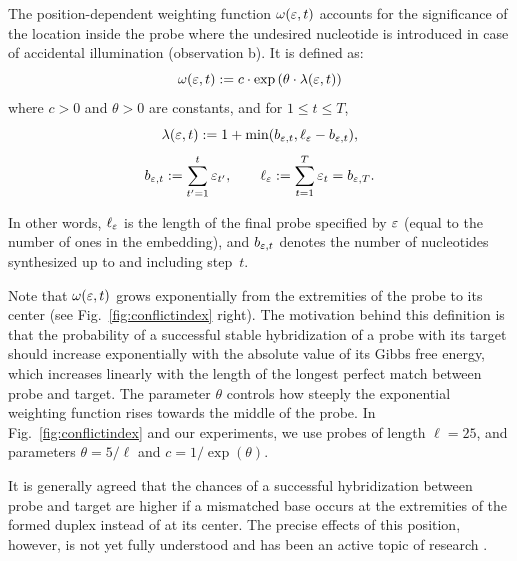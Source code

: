 The position-dependent weighting function $\omega(\varepsilon,t)$ accounts for
the significance of the location inside the probe where the undesired nucleotide
is introduced in case of accidental illumination (observation b). It is defined
as:
\begin{equation}\label{eq:pos_mult}
\omega(\varepsilon,t) := c \cdot \exp{\left(\theta \cdot \lambda(\varepsilon,t)\right)}
\end{equation}
where $c>0$ and $\theta>0$ are constants, and for $1\leq t\leq T$,
\begin{equation}\label{eq:base_pos}
  \lambda(\varepsilon,t) := 1 + \min(b_{\varepsilon,t},\ell_{\varepsilon} - b_{\varepsilon,t}),
\end{equation}
\begin{equation}\label{eq:b_ell}
  b_{\varepsilon,t} := \sum_{t'=1}^{t} \varepsilon_{t'},
  \qquad
  \ell_{\varepsilon} := \sum_{t=1}^{T} \varepsilon_t = b_{\varepsilon,T}.
\end{equation}

In other words, $\ell_\varepsilon$ is the length of the final probe specified
by $\varepsilon$ (equal to the number of ones in the embedding), and
$b_{\varepsilon,t}$ denotes the number of nucleotides synthesized up to and
including step~$t$.

Note that $\omega(\varepsilon,t)$ grows exponentially from the extremities of the
probe to its center (see Fig.~\ref{fig:conflictindex} right). The motivation
behind this definition is that the probability of a successful stable
hybridization of a probe with its target should increase exponentially with
the absolute value of its Gibbs free energy, which increases linearly with the
length of the longest perfect match between probe and target. The parameter
$\theta$ controls how steeply the exponential weighting function rises towards
the middle of the probe. In Fig.~\ref{fig:conflictindex} and our experiments,
we use probes of length $\ell=25$, and parameters $\theta = 5/\ell$ and $c =
1/\exp{(\theta)}$.

It is generally agreed that the chances of a successful hybridization
between probe and target are higher if a mismatched base occurs at the
extremities of the formed duplex instead of at its center. The precise
effects of this position, however, is not yet fully understood and has been
an active topic of research \citep{BINDER05}.

